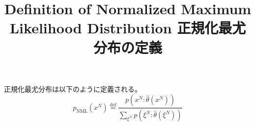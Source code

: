 \documentclass{jsarticle}
\title{Definition of Normalized Maximum Likelihood Distribution \newline 正規化最尤分布の定義}
\begin{document}
\maketitle
正規化最尤分布は以下のように定義される。
\begin{equation}
    p_\mathrm{NML} \left( x^N \right) \mathop{=}\limits^{\mathrm{def}} \frac{p \left( x^N: \hat{\theta} \left( x^N \right) \right)}{\sum_{\xi^N} p \left( \xi^N: \hat{\theta} \left( \xi^N \right) \right)}
\end{equation}
\end{document}
